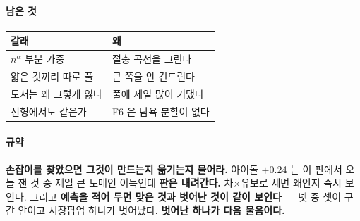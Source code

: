 \documentclass[10pt]{article}
\begin{document}
\paragraph{남은 것}
\begin{center}\small
\begin{tabular}{ll}
\hline
갈래 & 왜 \\
\hline
$n^{\alpha}$ 부분 가중 & 절충 곡선을 그린다 \\
얇은 것끼리 따로 풀 & 큰 쪽을 안 건드린다 \\
도서는 왜 그렇게 잃나 & 풀에 제일 많이 기댔다 \\
선형에서도 같은가 & F6 은 탐욕 분할이 없다 \\
\hline
\end{tabular}
\end{center}

\paragraph{규약} \textbf{손잡이를 찾았으면 그것이 만드는지 옮기는지 물어라.}
아이돌 $+$0.24 는 이 판에서 오늘 잰 것 중 제일 큰 도메인 이득인데
\textbf{판은 내려간다.} 차$\times$유보로 세면 왜인지 즉시 보인다.
그리고 \textbf{예측을 적어 두면 맞은 것과 벗어난 것이 같이 보인다} ---
넷 중 셋이 구간 안이고 시장팝업 하나가 벗어났다. \textbf{벗어난 하나가
다음 물음이다.}
\end{document}
